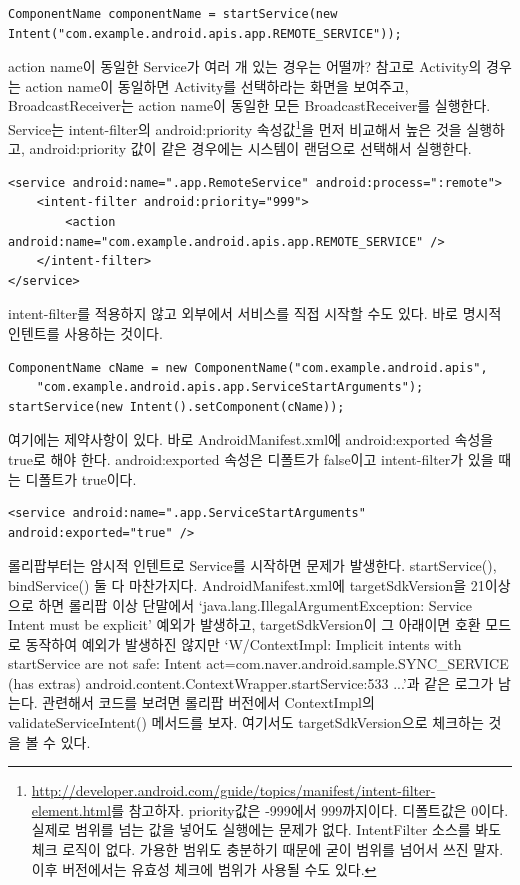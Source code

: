 \begin{lstlisting}[frame=single]
ComponentName componentName = startService(new Intent("com.example.android.apis.app.REMOTE_SERVICE"));
\end{lstlisting}
action name이 동일한 Service가 여러 개 있는 경우는 어떨까? 참고로 Activity의 경우는 action name이 동일하면 Activity를 선택하라는 화면을 보여주고, BroadcastReceiver는 action name이 동일한 모든 BroadcastReceiver를 실행한다.
Service는 intent-filter의 android:priority 속성값\footnote{\url{http://developer.android.com/guide/topics/manifest/intent-filter-element.html}를 참고하자. priority값은 -999에서 999까지이다. 디폴트값은 0이다. 실제로 범위를 넘는 값을 넣어도 실행에는 문제가 없다. IntentFilter 소스를 봐도 체크 로직이 없다. 가용한 범위도 충분하기 때문에 굳이 범위를 넘어서 쓰진 말자. 이후 버전에서는 유효성 체크에 범위가 사용될 수도 있다.}을 먼저 비교해서 높은 것을 실행하고, android:priority 값이 같은 경우에는 시스템이 랜덤으로 선택해서 실행한다.

\begin{lstlisting}[frame=single]
<service android:name=".app.RemoteService" android:process=":remote">
	<intent-filter android:priority="999">
		<action android:name="com.example.android.apis.app.REMOTE_SERVICE" />
	</intent-filter>
</service>
\end{lstlisting}

intent-filter를 적용하지 않고 외부에서 서비스를 직접 시작할 수도 있다. 바로 명시적 인텐트를 사용하는 것이다.
\begin{lstlisting}[frame=single]
ComponentName cName = new ComponentName("com.example.android.apis",
	"com.example.android.apis.app.ServiceStartArguments");
startService(new Intent().setComponent(cName));
\end{lstlisting}

여기에는 제약사항이 있다. 바로 AndroidManifest.xml에 android:exported 속성을 true로 해야 한다. android:exported 속성은 디폴트가 false이고 intent-filter가 있을 때는 디폴트가 true이다.
\begin{lstlisting}[frame=single]
<service android:name=".app.ServiceStartArguments" android:exported="true" />
\end{lstlisting}

롤리팝부터는 암시적 인텐트로 Service를 시작하면 문제가 발생한다. startService(), bindService() 둘 다 마찬가지다.
AndroidManifest.xml에 targetSdkVersion을 21이상으로 하면 롤리팝 이상 단말에서 `java.lang.IllegalArgu\-mentException: Service Intent must be explicit'  예외가 발생하고, targetSdkVersion이 그 아래이면 호환 모드로 동작하여 예외가 발생하진 않지만 `W/ContextImpl: Implicit intents with startService are not safe: Intent { act=com.naver.android.sample.SYNC\_SERVICE (has extras) } android.content.ContextWrapper.startService:533 ...'과 같은 로그가 남는다. 
관련해서 코드를 보려면 롤리팝 버전에서 ContextImpl의 validateServiceIntent() 메서드를 보자. 여기서도 targetSdkVersion으로 체크하는 것을 볼 수 있다.\\

